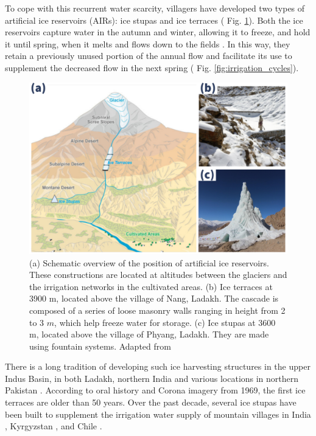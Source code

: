 To cope with this recurrent water scarcity, villagers have developed two types of artificial ice reservoirs
(AIRs): ice stupas and ice terraces ( Fig. \ref{fig:AIRforms}). Both the ice reservoirs capture water in the
autumn and winter, allowing it to freeze, and hold it until spring, when it melts and flows down to the fields
\citep{ipccChapterHighMountain2019, vinceGlacierMan2009, clouseLadakhArtificialGlaciers2017,
nusserSociohydrologyArtificialGlaciers2019}. In this way, they retain a previously unused portion of the annual
flow and facilitate its use to supplement the decreased flow in the next spring ( Fig.
\ref{fig:irrigation_cycles}).

\begin{figure}[t]
\centering
\includegraphics[width=\textwidth]{figs/AIR_forms.jpg}

\caption{(a) Schematic overview of the position of artificial ice reservoirs. These constructions are located at
  altitudes between the glaciers and the irrigation networks in the cultivated areas. (b) Ice terraces at 3900
  m, located above the village of Nang, Ladakh. The cascade is composed of a series of loose masonry walls
  ranging in height from 2 to 3 $m$, which help freeze water for storage. (c) Ice stupas at 3600 m, located
above the village of Phyang, Ladakh. They are made using fountain systems. Adapted from
\cite{nusserLocalKnowledgeGlobal2016}}

\label{fig:AIRforms}
\end{figure}

There is a long tradition of developing such ice harvesting structures in the upper Indus Basin, in both Ladakh,
northern India \citep{labbalTraditionalOasesLadakh2000, nusserIrrigationDevelopmentUpper2012} and various
locations in northern Pakistan \citep{kreutzmannScarcityOpulenceWater2011}. According to oral history and Corona
imagery from 1969, the first ice terraces are older than 50 years. Over the past decade, several ice stupas have been built to supplement the irrigation water supply of mountain
villages in India \citep{wangchukIceStupaCompetition2020, palmerStoringFrozenWater2022,
aggarwalAdaptationClimateChange2021}, Kyrgyzstan \citep{bbcnewsBrightArtificialGlacier2020}, and Chile
\citep{reutersConservationistsChileAim2021}.


